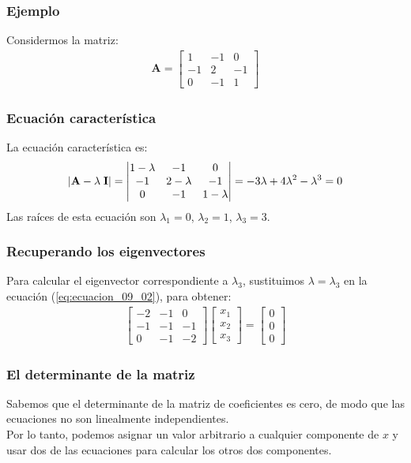 \documentclass[12pt]{beamer}
\begin{document}
\begin{frame}
\frametitle{Ejemplo}
Considermos la matriz:
\pause
\begin{align}
\mathbf{A} = \begin{bmatrix}
1 & -1 & 0 \\
-1 & 2 & -1 \\
0 & -1 & 1
\end{bmatrix}
\label{eq:ecuacion_09_a}
\end{align}
\end{frame}
\begin{frame}
\frametitle{Ecuación característica}
La ecuación característica es:
\pause
\begin{align}
\abs{ \mathbf{A} - \lambda \; \mathbf{I} }=  \begin{vmatrix}
1 - \lambda & -1 & 0 \\
-1 & 2 - \lambda & -1 \\
0 & -1 & 1 - \lambda
\end{vmatrix} 
= -3 \lambda +  4 \lambda^{2} - \lambda^{3} = 0
\label{eq:ecuacion_09_b}
\end{align}
\pause
Las raíces de esta ecuación son $\lambda_{1} = 0$, $\lambda_{2} = 1$, $\lambda_{3} = 3$.
\end{frame}
\begin{frame}
\frametitle{Recuperando los eigenvectores}
Para calcular el eigenvector correspondiente a $\lambda_{3}$, \pause sustituimos $\lambda = \lambda_{3}$ en la ecuación (\ref{eq:ecuacion_09_02}), para obtener:
\pause
\begin{align}
\begin{bmatrix}
-2 & -1 & 0 \\
-1 & -1 & -1 \\
0 & -1 & -2
\end{bmatrix}
\begin{bmatrix}
x_{1} \\
x_{2} \\
x_{3} 
\end{bmatrix} = 
\begin{bmatrix}
0 \\
0 \\
0
\end{bmatrix}
\label{eq:ecuacion_09_c}
\end{align}
\end{frame}
\begin{frame}
\frametitle{El determinante de la matriz}
Sabemos que el determinante de la matriz de coeficientes es cero, de modo que las ecuaciones no son linealmente independientes. 
\\
\bigskip
\pause
Por lo tanto, podemos asignar un valor arbitrario a cualquier componente de $x$ y usar dos de las ecuaciones para calcular los otros dos componentes.
\end{frame}
\end{document}
